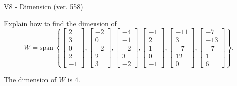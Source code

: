 \begin{exercise}
  \begin{exerciseTitle}V8 - Dimension (ver. 558)\end{exerciseTitle}
  \begin{exerciseStatement}
    Explain how to find the dimension of 
\[W=\mathrm{span}\ \left\{\left[\begin{array}{r}
2 \\
3 \\
0 \\
2 \\
-1
\end{array}\right] , \left[\begin{array}{r}
-2 \\
0 \\
-2 \\
2 \\
3
\end{array}\right] , \left[\begin{array}{r}
-4 \\
-1 \\
-2 \\
3 \\
-2
\end{array}\right] , \left[\begin{array}{r}
-1 \\
2 \\
1 \\
0 \\
-1
\end{array}\right] , \left[\begin{array}{r}
-11 \\
3 \\
-7 \\
12 \\
0
\end{array}\right] , \left[\begin{array}{r}
-7 \\
-13 \\
-7 \\
1 \\
6
\end{array}\right]\right\}.\]



  \end{exerciseStatement}
  \begin{exerciseAnswer}
   The dimension of \(W\) is  \(4\).
  


  \end{exerciseAnswer}
\end{exercise}